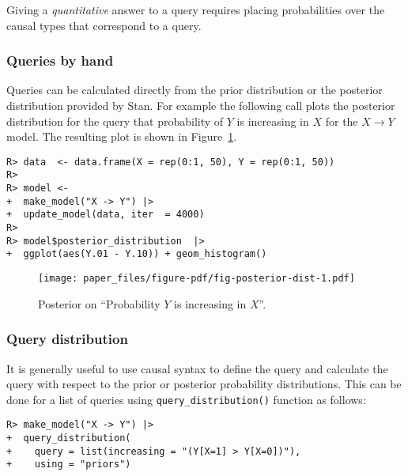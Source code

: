 \documentclass[
  11pt,
  article]{jss}
\begin{document}
Giving a \emph{quantitative} answer to a query requires placing
probabilities over the causal types that correspond to a query.

\hypertarget{queries-by-hand}{%
\subsubsection{Queries by hand}\label{queries-by-hand}}

Queries can be calculated directly from the prior distribution or the
posterior distribution provided by Stan. For example the following call
plots the posterior distribution for the query that probability of \(Y\)
is increasing in \(X\) for the \(X \rightarrow Y\) model. The resulting
plot is shown in Figure~\ref{fig-posterior-dist}.

\begin{verbatim}
R> data  <- data.frame(X = rep(0:1, 50), Y = rep(0:1, 50))
R> 
R> model <- 
+  make_model("X -> Y") |>
+  update_model(data, iter  = 4000)
R> 
R> model$posterior_distribution  |> 
+  ggplot(aes(Y.01 - Y.10)) + geom_histogram()
\end{verbatim}

\begin{figure}[t]

{\centering \texttt{[image: paper\_files/figure-pdf/fig-posterior-dist-1.pdf]}

}

\caption{\label{fig-posterior-dist}Posterior on ``Probability \(Y\) is
increasing in \(X\)''.}

\end{figure}

\FloatBarrier

\hypertarget{query-distribution}{%
\subsubsection{Query distribution}\label{query-distribution}}

It is generally useful to use causal syntax to define the query and
calculate the query with respect to the prior or posterior probability
distributions. This can be done for a list of queries using
\texttt{query\_distribution()} function as follows:

\begin{verbatim}
R> make_model("X -> Y") |> 
+  query_distribution(
+    query = list(increasing = "(Y[X=1] > Y[X=0])"), 
+    using = "priors")
\end{verbatim}
\end{document}
